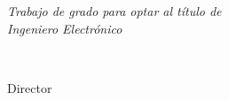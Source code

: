 
\thispagestyle{empty} %

\noindent \begin{center}
\textbf{\large ~}
\par\end{center}{\large \par}

\begin{center}
{\large \inserttitulo}
\par\end{center}{\Large \par}

\noindent \begin{center}
\textbf{\large ~}
\par\end{center}{\large \par}

\noindent \begin{center}
\textbf{\large ~}
\par\end{center}{\large \par}

\begin{singlespace} %
\noindent \begin{center} %
\Large \textsc{\insertautoruno} \\
\textbf{\large ~}
\par\end{center}{\large \par}
\end{singlespace}
\noindent \begin{center}
{\emph{\Large Trabajo de grado para optar al título de\\ Ingeniero Electrónico }}
\par\end{center}{\LARGE \par}

\noindent \begin{center}
\textbf{\large ~}
\par\end{center}{\large \par}

\begin{singlespace}
\noindent \begin{center}
{\large Director }\\
{\Large \textsc{\insertdirector} }\textbf{\large }\\
{\large \insertcargodirector }
\par\end{center}{\large \par}
\end{singlespace}

